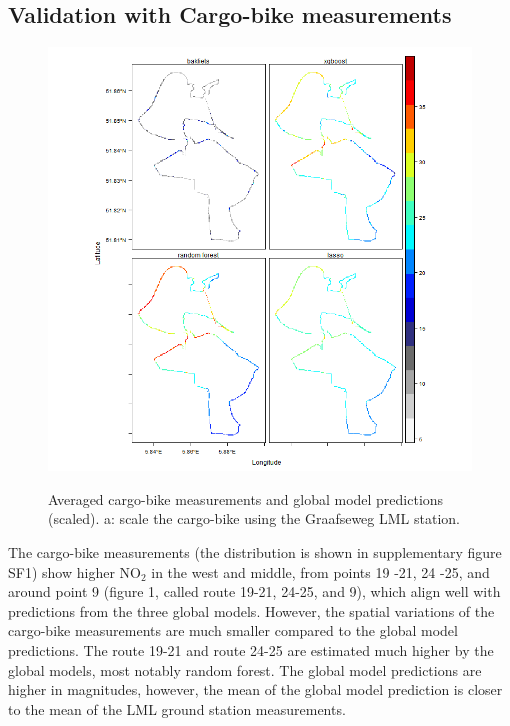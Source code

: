 \documentclass{article}
\begin{document}
\subsection{Validation with Cargo-bike measurements}

\begin{figure}[H]
    \includegraphics[width=\linewidth]{f4.png}
    \label{seperate}
    \caption {Averaged cargo-bike measurements and global model predictions (scaled). a: scale the cargo-bike using the Graafseweg LML station.}
\end{figure}
The cargo-bike measurements (the distribution is shown in supplementary figure SF1) show higher NO$_2$ in the west and middle, from points 19 -21, 24 -25, and around point 9 (figure 1, called route 19-21, 24-25, and 9), which align well with predictions from the three global models. However, the spatial variations of the cargo-bike measurements are much smaller compared to the global model predictions. The route 19-21 and route 24-25 are estimated much higher by the global models, most notably random forest.    
The global model predictions are higher in magnitudes, however, the mean of the global model prediction is closer to the mean of the LML ground station measurements. 
\end{document}
